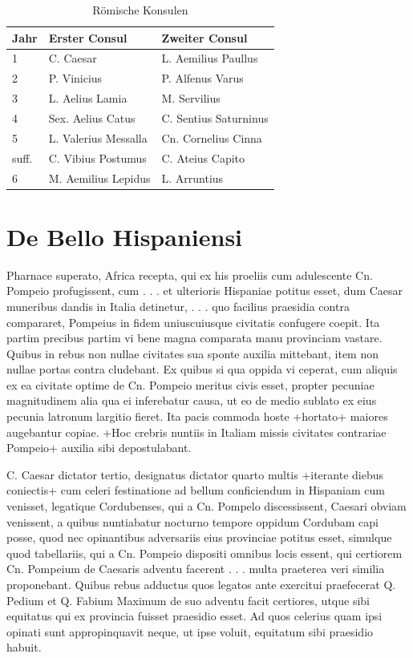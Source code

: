 \begin{table}[htb]
\begin{center}
\begin{tabular}{|l|l|l|}
\hline
Jahr &  Erster Consul & Zweiter Consul\\
\hline \hline
1 & C. Caesar         & L. Aemilius Paullus\\
2 & P. Vinicius       & P. Alfenus Varus\\
3 & L. Aelius Lamia   & M. Servilius\\
4 & Sex. Aelius Catus &  C. Sentius Saturninus\\
5 & L. Valerius Messalla& Cn. Cornelius Cinna \\
suff. & C. Vibius Postumus &  C. Ateius Capito\\
6 & M. Aemilius Lepidus & L. Arruntius\\
\hline
\end{tabular}
 \caption{Römische Konsulen}\label{tab_Konsulen}
\end{center}
\end{table}


\pagebreak

\section{De Bello Hispaniensi}\raggedbottom 

Pharnace superato, Africa recepta, qui ex his proeliis cum
adulescente Cn. Pompeio profugissent, cum . . . et ulterioris
Hispaniae potitus esset, dum Caesar muneribus dandis in Italia
detinetur, . . . quo facilius praesidia contra compararet,
Pompeius in fidem uniuscuiusque civitatis confugere coepit. Ita
partim precibus partim vi bene magna comparata manu provinciam
vastare. Quibus in rebus non nullae civitates sua sponte auxilia
mittebant, item non nullae portas contra cludebant. Ex quibus si
qua oppida vi ceperat, cum aliquis ex ea civitate optime de Cn.
Pompeio meritus civis esset, propter pecuniae magnitudinem alia
qua ei inferebatur causa, ut eo de medio sublato ex eius pecunia
latronum largitio fieret. Ita pacis commoda hoste +hortato+
maiores augebantur copiae. +Hoc crebris nuntiis in Italiam missis
civitates contrariae Pompeio+ auxilia sibi depostulabant.

C. Caesar dictator tertio, designatus dictator quarto multis
+iterante diebus coniectis+ cum celeri festinatione ad bellum
conficiendum in Hispaniam cum venisset, legatique Cordubenses, qui
a Cn. Pompelo discessissent, Caesari obviam venissent, a quibus
nuntiabatur nocturno tempore oppidum Cordubam capi posse, quod nec
opinantibus adversariis eius provinciae potitus esset, simulque
quod tabellariis, qui a Cn. Pompeio dispositi omnibus locis
essent, qui certiorem Cn. Pompeium de Caesaris adventu facerent .
. . multa praeterea veri similia proponebant. Quibus rebus
adductus quos legatos ante exercitui praefecerat Q. Pedium et Q.
Fabium Maximum de suo adventu facit certiores, utque sibi
equitatus qui ex provincia fuisset praesidio esset. Ad quos
celerius quam ipsi opinati sunt appropinquavit neque, ut ipse
voluit, equitatum sibi praesidio habuit.

